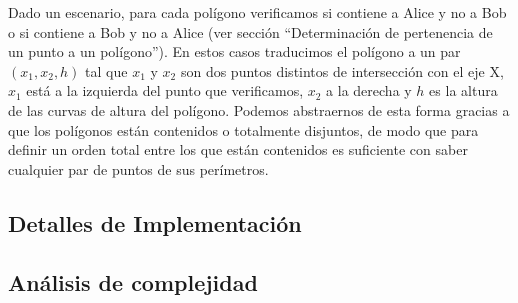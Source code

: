 Dado un escenario, para cada polígono verificamos si contiene a Alice y no a Bob o si contiene a Bob y no
a Alice (ver sección ``Determinación de pertenencia de un punto a un polígono''). En estos casos traducimos
el polígono a un par $(x_1, x_2, h)$ tal que $x_1$ y $x_2$ son dos puntos distintos de intersección con el
eje X, $x_1$ está a la izquierda del punto que verificamos, $x_2$ a la derecha y $h$ es la altura de las
curvas de altura del polígono. Podemos abstraernos de esta forma gracias a que los polígonos están
contenidos o totalmente disjuntos, de modo que para definir un orden total entre los que están contenidos
es suficiente con saber cualquier par de puntos de sus perímetros.

\subsection*{Detalles de Implementación}

\subsection*{Análisis de complejidad}